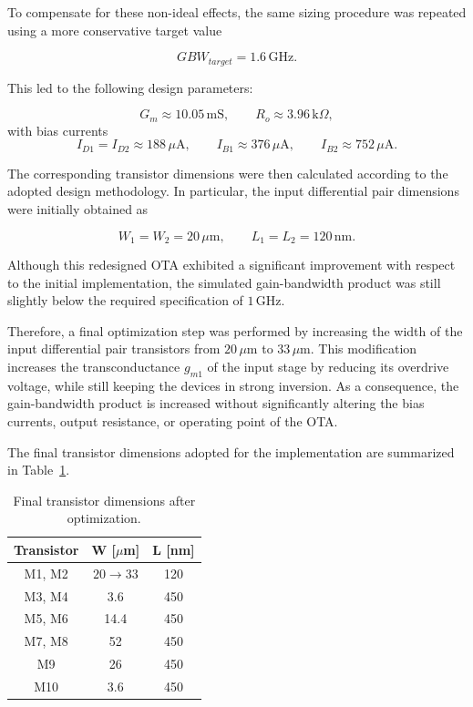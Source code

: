 To compensate for these non-ideal effects, the same sizing procedure was repeated using a more conservative target value

\[
GBW_{target}=1.6\,\mathrm{GHz}.
\]

This led to the following design parameters:

\[
G_m \approx 10.05\,\mathrm{mS},
\qquad
R_o \approx 3.96\,\mathrm{k}\Omega,
\]
with bias currents
\[
I_{D1}=I_{D2}\approx188\,\mu\mathrm{A},
\qquad
I_{B1}\approx376\,\mu\mathrm{A},
\qquad
I_{B2}\approx752\,\mu\mathrm{A}.
\]

The corresponding transistor dimensions were then calculated according to the adopted design methodology. In particular, the input differential pair dimensions were initially obtained as

\[
W_1=W_2=20\,\mu\mathrm{m},
\qquad
L_1=L_2=120\,\mathrm{nm}.
\]

Although this redesigned OTA exhibited a significant improvement with respect to the initial implementation, the simulated gain-bandwidth product was still slightly below the required specification of $1\,\mathrm{GHz}$.

Therefore, a final optimization step was performed by increasing the width of the input differential pair transistors from $20\,\mu\mathrm{m}$ to $33\,\mu\mathrm{m}$. This modification increases the transconductance $g_{m1}$ of the input stage by reducing its overdrive voltage, while still keeping the devices in strong inversion. As a consequence, the gain-bandwidth product is increased without significantly altering the bias currents, output resistance, or operating point of the OTA.

The final transistor dimensions adopted for the implementation are summarized in Table~\ref{tab:final_sizing2}.

\begin{table}[H]
\centering
\caption{Final transistor dimensions after optimization.}
\label{tab:final_sizing2}

\begin{tabular}{|c|c|c|}
\hline
\textbf{Transistor} & \textbf{W [$\mu$m]} & \textbf{L [nm]} \\ \hline
M1, M2 & $20 \xrightarrow{} 33$ & 120 \\ \hline
M3, M4 & 3.6 & 450 \\ \hline
M5, M6 & 14.4 & 450 \\ \hline
M7, M8 & 52 & 450 \\ \hline
M9 & 26 & 450 \\ \hline
M10 & 3.6 & 450 \\ \hline
\end{tabular}

\end{table}
